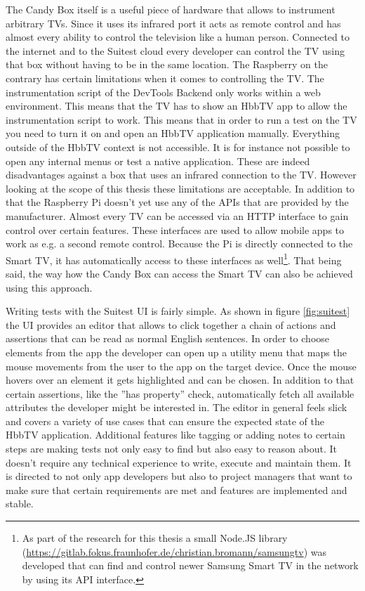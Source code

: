 The Candy Box itself is a useful piece of hardware that allows to instrument arbitrary TVs. Since it uses its infrared port it acts as remote control and has almost every ability to control the television like a human person. Connected to the internet and to the Suitest cloud every developer can control the TV using that box without having to be in the same location. The Raspberry on the contrary has certain limitations when it comes to controlling the TV. The instrumentation script of the DevTools Backend only works within a web environment. This means that the TV has to show an HbbTV app to allow the instrumentation script to work. This means that in order to run a test on the TV you need to turn it on and open an HbbTV application manually. Everything outside of the HbbTV context is not accessible. It is for instance not possible to open any internal menus or test a native application. These are indeed disadvantages against a box that uses an infrared connection to the TV. However looking at the scope of this thesis these limitations are acceptable. In addition to that the Raspberry Pi doesn't yet use any of the APIs that are provided by the manufacturer. Almost every TV can be accessed via an HTTP interface to gain control over certain features. These interfaces are used to allow mobile apps to work as e.g. a second remote control. Because the Pi is directly connected to the Smart TV, it has automatically access to these interfaces as well\footnote{As part of the research for this thesis a small Node.JS library (\url{https://gitlab.fokus.fraunhofer.de/christian.bromann/samsungtv}) was developed that can find and control newer Samsung Smart TV in the network by using its API interface.}. That being said, the way how the Candy Box can access the Smart TV can also be achieved using this approach.

Writing tests with the Suitest UI is fairly simple. As shown in figure \ref{fig:suitest} the UI provides an editor that allows to click together a chain of actions and assertions that can be read as normal English sentences. In order to choose elements from the app the developer can open up a utility menu that maps the mouse movements from the user to the app on the target device. Once the mouse hovers over an element it gets highlighted and can be chosen. In addition to that certain assertions, like the ''has property'' check, automatically fetch all available attributes the developer might be interested in. The editor in general feels slick and covers a variety of use cases that can ensure the expected state of the HbbTV application. Additional features like tagging or adding notes to certain steps are making tests not only easy to find but also easy to reason about. It doesn't require any technical experience to write, execute and maintain them. It is directed to not only app developers but also to project managers that want to make sure that certain requirements are met and features are implemented and stable.

